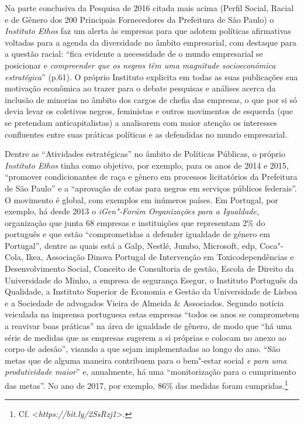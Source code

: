 Na parte conclusiva da Pesquisa de 2016 citada mais acima (Perfil
Social, Racial e de Gênero dos 200 Principais Fornecedores da Prefeitura
de São Paulo) o \emph{Instituto Ethos} faz um alerta às empresas para
que adotem políticas afirmativas voltadas para a agenda da diversidade
no âmbito empresarial, com destaque para a questão racial: ``fica
evidente a necessidade de o mundo empresarial se posicionar e
\emph{compreender que os negros têm uma magnitude socioeconômica
estratégica}'' (p.61). O próprio Instituto explicita em todas as suas
publicações sua motivação econômica ao trazer para o debate pesquisas e
análises acerca da inclusão de minorias no âmbito dos cargos de chefia
das empresas, o que por si só devia levar os coletivos negros,
feministas e outros movimentos de esquerda (que se pretendam
anticapitalistas) a analisarem com maior atenção os interesses
confluentes entre suas práticas políticas e as defendidas no mundo
empresarial.

Dentre as ``Atividades estratégicas'' no âmbito de Políticas Públicas, o
próprio \emph{Instituto Ethos} tinha como objetivo, por exemplo, para os
anos de 2014 e 2015, ``promover condicionantes de raça e gênero em
processos licitatórios da Prefeitura de São Paulo'' e a ``aprovação de
cotas para negros em serviços públicos federais''. O movimento é global,
com exemplos em inúmeros países. Em Portugal, por exemplo, há desde 2013
o \emph{iGen"-Forúm Organizações para a Igualdade,} organização que junta
68 empresas e instituições que representam 2\% do  português e que
estão ``comprometidas a defender igualdade de género em Portugal'',
dentre as quais está a Galp, Nestlé, Jumbo, Microsoft, edp, Coca"-Cola,
Ikea, Associação Dinova Portugal de Intervenção em Toxicodependências e
Desenvolvimento Social, Conceito de Consultoria de gestão, Escola de
Direito da Universidade do Minho, a empresa de segurança Esegur, o
Instituto Português da Qualidade, a Instituto Superior de Economia e
Gestão da Universidade de Lisboa e a Sociedade de advogados Vieira de
Almeida \& Associados. Segundo notícia veiculada na imprensa portuguesa
estas empresas ``todos os anos se comprometem a reavivar boas práticas''
na área de igualdade de gênero, de modo que ``há uma série de medidas
que as empresas sugerem a si próprias e colocam no anexo ao corpo de
adesão'', visando a que sejam implementadas ao longo do ano. ``São metas
que de alguma maneira contribuem para o bem"-estar social \emph{e para
uma produtividade maior}'' e, anualmente, há uma ``monitorização para o
cumprimento das metas''. No ano de 2017, por exemplo, 86\% das medidas
foram cumpridas.\footnote{Cf. \textless{}\emph{https://bit.ly/2SsRzj1}\textgreater{}.}


